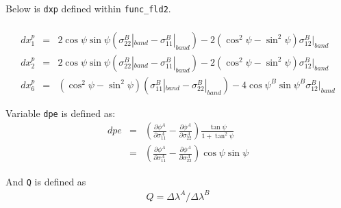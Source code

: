 \documentclass[12pt]{amsart}
\begin{document}
Below is \verb|dxp| defined within \verb|func_fld2|.

\begin{eqnarray}
  \label{eq:dxp}
  \\
  dx^p_1&=&2\cos\psi\sin\psi(\sigma_{22}^B|_{band}-\sigma_{11}^B|_{band})  - 2 (\cos^2\psi-\sin^2\psi) \sigma_{12}^B|_{band} \nonumber\\
  dx^p_2&=&2\cos\psi\sin\psi(\sigma_{22}^B|_{band}-\sigma_{11}^B|_{band})    - 2 (\cos^2\psi-\sin^2\psi) \sigma_{12}^B|_{band}\nonumber \\
  dx^p_6&=&(\cos^2\psi-\sin^2\psi) (\sigma^B_{11}|_{band}-\sigma^B_{22}|_{band}) - 4 \cos\psi^B \sin\psi^B \sigma_{12}^B|_{band}\nonumber
\end{eqnarray}

Variable \verb|dpe| is defined as:
\begin{eqnarray}
  \label{eq:dpe}
  dpe &=&(\frac{\partial \phi^A}{\partial\sigma^A_{11}}-\frac{\partial \phi^A}{\partial\sigma^A_{22}}) \frac{\tan\psi }{1+\tan^2\psi}\\
      &=&(\frac{\partial \phi^A}{\partial\sigma^A_{11}}-\frac{\partial \phi^A}{\partial\sigma^A_{22}})\cos\psi\sin\psi\nonumber
\end{eqnarray}

And \verb|Q| is defined as
\begin{eqnarray}
  \label{eq:Q}
  Q = \Delta\lambda^A/\Delta\lambda^B
\end{eqnarray}
\end{document}
